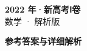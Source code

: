 \documentclass[zihao=-4, a4paper]{ctexart}
\begin{document}
\begin{center}
  {\Large\bfseries 2022 年·新高考Ⅰ卷}\\[4pt]
  {\large 数学 · 解析版}
\end{center}
\medskip
{}

\clearpage
{}
\begin{center}{\Large\bfseries 参考答案与详细解析}\end{center}
\medskip

\end{document}
